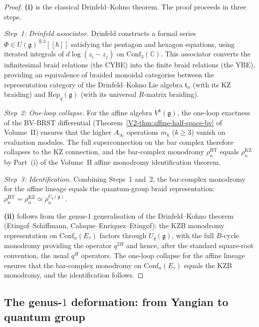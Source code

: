 \begin{proof}
\textbf{(i)} is the classical Drinfeld--Kohno theorem. The proof
proceeds in three steps.

\emph{Step~1: Drinfeld associator.}
Drinfeld constructs a formal series
$\Phi \in U(\mathfrak{g})^{\widehat\otimes 3}[\![\hbar]\!]$
satisfying the pentagon and hexagon equations, using iterated integrals
of $d\log(z_i - z_j)$ on $\mathrm{Conf}_3(\mathbb{C})$. This
associator converts the infinitesimal braid relations (the CYBE) into
the finite braid relations (the YBE), providing an equivalence of
braided monoidal categories between the representation category of the
Drinfeld--Kohno Lie algebra $\mathfrak{t}_n$ (with its KZ braiding)
and $\mathrm{Rep}_q(\mathfrak{g})$ (with its universal $R$-matrix
braiding).

\emph{Step~2: One-loop collapse.}
For the affine algebra $V^k(\mathfrak{g})$, the one-loop exactness of
the BV-BRST differential (Theorem~\ref*{V2-thm:affine-half-space-bv} of
Volume~II) ensures that the higher $A_\infty$ operations $m_k$
($k \geq 3$) vanish on evaluation modules. The full superconnection
on the bar complex therefore collapses to the KZ connection, and the
bar-complex monodromy $\rho_n^{\mathrm{HT}}$ equals $\rho_n^{\mathrm{KZ}}$
by Part~(i) of the Volume~II affine monodromy identification theorem.

\emph{Step~3: Identification.}
Combining Steps~1 and~2, the bar-complex monodromy for the affine
lineage equals the quantum-group braid representation:
$\rho_n^{\mathrm{HT}} = \rho_n^{\mathrm{KZ}} \simeq
\rho_n^{U_q(\mathfrak{g})}$.

\medskip
\noindent\textbf{(ii)} follows from the genus-$1$ generalisation of the
Drinfeld--Kohno theorem (Etingof--Schiffmann, Calaque--Enriquez--Etingof):
the KZB monodromy representation on $\mathrm{Conf}_n(E_\tau)$ factors
through $U_q(\mathfrak{g})$, with the full $B$-cycle monodromy providing
the operator $q^{2H}$ and hence, after the standard square-root
convention, the usual $q^H$ operators. The one-loop collapse for the affine lineage ensures
that the bar-complex monodromy on $\mathrm{Conf}_n(E_\tau)$ equals the
KZB monodromy, and the identification follows.
\end{proof}

\subsection{The genus-$1$ deformation: from Yangian to quantum group}
\label{sec:yangian-to-quantum}

